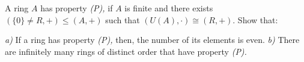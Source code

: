 A ring $ A $ has property \textit{(P),} if $ A $ is finite and there exists $ (\{ 0\}\neq R,+)\le (A,+) $ such that $ (U(A),\cdot )\cong (R,+) . $ Show that:

\textit{a)} If a ring has property \textit{(P),} then, the number of its elements is even.
\textit{b)} There are infinitely many rings of distinct order that have property \textit{(P).}